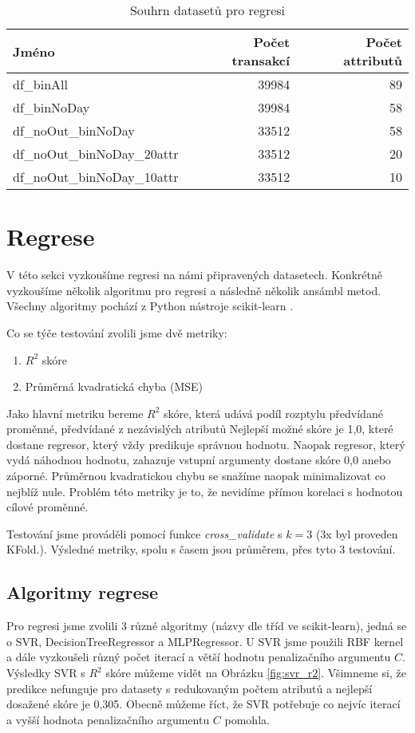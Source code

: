 \documentclass[a4paper,12pt]{article}
\begin{document}
\begin{table}
    \centering
    \begin{tabular}{l | r | r}
        Jméno                           & Počet transakcí   & Počet attributů \\\hline\hline
        df\_binAll                      & 39984             & 89 \\
        df\_binNoDay                    & 39984             & 58 \\
        df\_noOut\_binNoDay             & 33512             & 58 \\
        df\_noOut\_binNoDay\_20attr     & 33512             & 20 \\  
        df\_noOut\_binNoDay\_10attr     & 33512             & 10 \\
    \end{tabular}
    \caption{Souhrn datasetů pro regresi}
    \label{tab:regression_datasets}
\end{table}

\section{Regrese}

V této sekci vyzkoušíme regresi na námi připravených datasetech. Konkrétně vyzkoušíme několik algoritmu pro 
regresi a následně několik ansámbl metod. Všechny algoritmy pochází z Python nástroje scikit-learn \cite{scikit-learn}.

Co se týče testování zvolili jsme dvě metriky:
\begin{enumerate}
    \item $R^2$ skóre
    \item Průměrná kvadratická chyba (MSE)
\end{enumerate}
Jako hlavní metriku bereme $R^2$ skóre, která udává podíl rozptylu předvídané proměnné, předvídané z nezávislých atributů
Nejlepší možné skóre je 1,0, které dostane regresor, který vždy predikuje správnou hodnotu. Naopak regresor, který vydá náhodnou hodnotu, 
zahazuje vstupní argumenty dostane skóre 0,0 anebo záporné. Průměrnou kvadratickou chybu se snažíme naopak minimalizovat
co nejblíž nule. Problém této metriky je to, že nevidíme přímou korelaci s hodnotou cílové proměnné.

Testování jsme prováděli pomocí funkce \emph{cross\_validate} s $k = 3$ (3x byl proveden KFold.). Výsledné metriky,
spolu s časem jsou průměrem, přes tyto 3 testování.

\subsection{Algoritmy regrese}
Pro regresi jsme zvolili 3 různé algoritmy (názvy dle tříd ve scikit-learn), jedná se o SVR, DecisionTreeRegressor a MLPRegressor.
U SVR jsme použili RBF kernel a dále vyzkoušeli různý počet iterací a větší hodnotu penalizačního argumentu $C$.
Výsledky SVR s $R^2$ skóre můžeme vidět na Obrázku \ref{fig:svr_r2}. 
Všimneme si, že predikce nefunguje pro datasety s redukovaným počtem atributů a nejlepší dosažené skóre je 0,305.
Obecně můžeme říct, že SVR potřebuje co nejvíc iterací a vyšší hodnota penalizačního argumentu $C$ pomohla.
\end{document}
